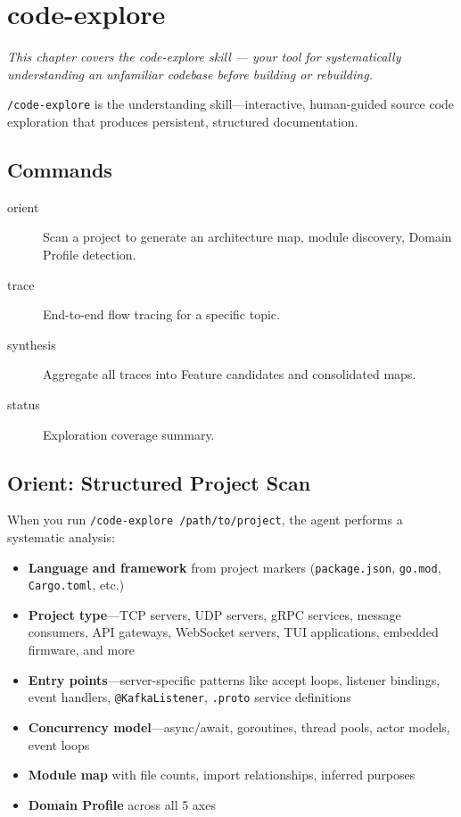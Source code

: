 \documentclass[11pt,a4paper,openright,twoside]{report}
\newcommand{\cmd}[1]{\texttt{/#1}}
\newcommand{\file}[1]{\texttt{#1}}
\begin{document}
\chapter{code-explore}
\label{ch:code-explore}

\textit{This chapter covers the code-explore skill --- your tool for systematically understanding an unfamiliar codebase before building or rebuilding.}

\cmd{code-explore} is the understanding skill---interactive, human-guided source code exploration that produces persistent, structured documentation.

\section{Commands}

\begin{description}
  \item[orient] Scan a project to generate an architecture map, module discovery, Domain Profile detection.
  \item[trace] End-to-end flow tracing for a specific topic.
  \item[synthesis] Aggregate all traces into Feature candidates and consolidated maps.
  \item[status] Exploration coverage summary.
\end{description}

\section{Orient: Structured Project Scan}

When you run \texttt{/code-explore /path/to/project}, the agent performs a systematic analysis:

\begin{itemize}
  \item \textbf{Language and framework} from project markers (\file{package.json}, \file{go.mod}, \file{Cargo.toml}, etc.)
  \item \textbf{Project type}---TCP servers, UDP servers, gRPC services, message consumers, API gateways, WebSocket servers, TUI applications, embedded firmware, and more
  \item \textbf{Entry points}---server-specific patterns like accept loops, listener bindings, event handlers, \texttt{@KafkaListener}, \texttt{.proto} service definitions
  \item \textbf{Concurrency model}---async/await, goroutines, thread pools, actor models, event loops
  \item \textbf{Module map} with file counts, import relationships, inferred purposes
  \item \textbf{Domain Profile} across all 5 axes
\end{itemize}
\end{document}
